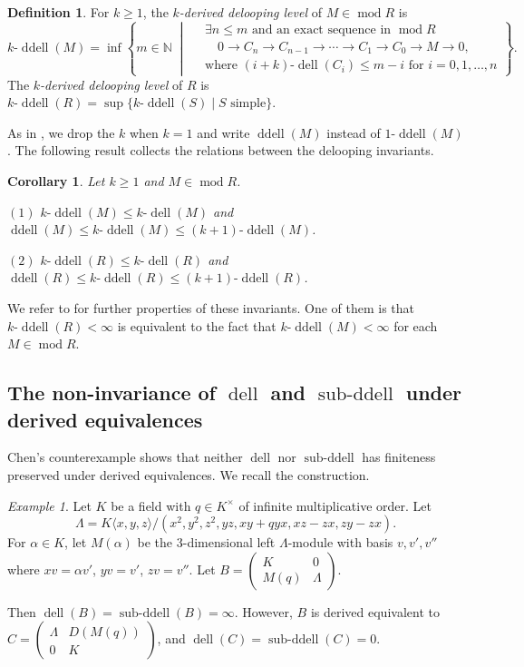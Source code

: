 \documentclass[12pt,a4paper,reqno]{amsart}
\theoremstyle{plain}
\newtheorem{corollary}[theorem]{Corollary}
\theoremstyle{definition}
\newtheorem{definition}[theorem]{Definition}
\theoremstyle{remark}
\newtheorem{example}[theorem]{Example}
\DeclareMathOperator{\modd}{mod}
\DeclareMathOperator{\dell}{dell}
\DeclareMathOperator{\subddell}{sub\text{-}ddell}
\DeclareMathOperator{\ddell}{ddell}
\begin{document}
\begin{definition}\label{def:ddell}
For $k\ge 1$, the \emph{$k$-derived delooping level} of $M \in \modd R$ is
\[
k\text{-}\ddell(M) = \inf \left\{ m \in \mathbb{N} \;\middle|\;
\begin{aligned}
&\exists n \leq m \text{ and an exact sequence in } \modd R \\
&\quad 0 \to C_n \to C_{n-1} \to \cdots \to C_1 \to C_0 \to M \to 0, \\
&\text{where } (i+k)\text{-}\dell(C_i) \leq m-i \text{ for } i=0,1,\ldots,n
\end{aligned}
\right\}.
\]
The \emph{$k$-derived delooping level} of $R$ is $k\text{-}\ddell(R) = \sup\{k\text{-}\ddell(S) \mid S \text{ simple}\}$.
\end{definition}

As in \cite{GuoIgusa}, we drop the $k$ when $k=1$ and write $\ddell(M)$ instead of $1\text{-}\ddell(M)$.
The following result collects the relations between the delooping invariants.

\begin{corollary}\label{cor:compare-k-dell} Let $k\ge 1$ and $M\in \modd R$.

   $(1)$ $k\text{-}\ddell(M)\le k\text{-}\dell(M)$ and $\ddell(M)\le k\text{-}\ddell(M) \le (k+1)\text{-}\ddell(M)$. 
   
   $(2)$ $k\text{-}\ddell(R)\le k\text{-}\dell(R)$ and  $\ddell(R)\le k\text{-}\ddell(R)\le (k+1)\text{-}\ddell(R)$. 
\end{corollary}

We refer to \cite[Section 3]{GuoIgusa} for further properties of these invariants. One of them is that $k\text{-}\ddell(R)<\infty$ is equivalent to the fact that $k\text{-}\ddell(M)<\infty$ for each $M\in \modd R$.

\subsection{The non-invariance of $\dell$ and $\subddell$ under derived equivalences}

Chen's counterexample \cite{Chen} shows that neither $\dell$ nor $\subddell$ has finiteness preserved under derived equivalences. We recall the construction.

\begin{example}\label{ex:kershaw-rickard}
Let $K$ be a field with $q \in K^\times$ of infinite multiplicative order. Let
\[
\Lambda = K\langle x,y,z\rangle/(x^2, y^2, z^2, yz, xy+qyx, xz-zx, zy-zx).
\]
For $\alpha \in K$, let $M(\alpha)$ be the 3-dimensional left $\Lambda$-module with basis $v,v',v''$ where $xv = \alpha v'$, $yv = v'$, $zv = v''$. Let $B = \begin{pmatrix} K & 0 \\ M(q) & \Lambda \end{pmatrix}$.

Then $\dell(B) = \subddell(B) = \infty$. However, $B$ is derived equivalent to $C = \begin{pmatrix} \Lambda & D(M(q)) \\ 0 & K \end{pmatrix}$, and $\dell(C) = \subddell(C) = 0$.
\end{example}
\end{document}
